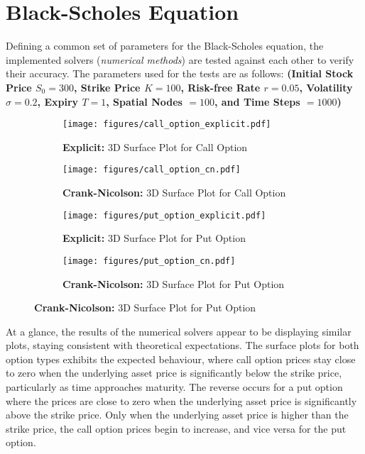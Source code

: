 \section{Black-Scholes Equation}\label{sec:bs_equation-results}
Defining a common set of parameters for the Black-Scholes equation, the implemented solvers (\textit{numerical methods}) are tested against each other to verify their accuracy. The parameters used for the tests are as follows:
\textbf{(Initial Stock Price $S_0 = 300$, Strike Price $K = 100$, Risk-free Rate $r = 0.05$, Volatility $\sigma = 0.2$, Expiry $T = 1$, Spatial Nodes $= 100$, and Time Steps $= 1000$)}

\begin{figure}[H]
    \centering
    \begin{subfigure}[t]{0.45\textwidth}
        \centering
        \texttt{[image: figures/call\_option\_explicit.pdf]}
        \caption{\textbf{Explicit:} 3D Surface Plot for Call Option}
        \label{fig:bs-explicit-call}
    \end{subfigure}
    \hfill
    \begin{subfigure}[t]{0.45\textwidth}
        \centering
        \texttt{[image: figures/call\_option\_cn.pdf]}
        \caption{\textbf{Crank-Nicolson:} 3D Surface Plot for Call Option}
        \label{fig:bs-cn-call}
    \end{subfigure}
    \hfill
    \begin{subfigure}[t]{0.45\textwidth}
        \centering
        \texttt{[image: figures/put\_option\_explicit.pdf]}
        \caption{\textbf{Explicit:} 3D Surface Plot for Put Option}
        \label{fig:bs-explicit-put}
    \end{subfigure}
    \hfill
    \begin{subfigure}[t]{0.45\textwidth}
        \centering
        \texttt{[image: figures/put\_option\_cn.pdf]}
        \caption{\textbf{Crank-Nicolson:} 3D Surface Plot for Put Option}
        \label{fig:bs-cn-put}
    \end{subfigure}
\end{figure}

At a glance, the results of the numerical solvers appear to be displaying similar plots, staying consistent with theoretical expectations. The surface plots for both option types exhibits the expected behaviour, where call option prices stay close to zero when the underlying asset price is significantly below the strike price, particularly as time approaches maturity. The reverse occurs for a put option where the prices are close to zero when the underlying asset price is significantly above the strike price. Only when the underlying asset price is higher than the strike price, the call option prices begin to increase, and vice versa for the put option.

